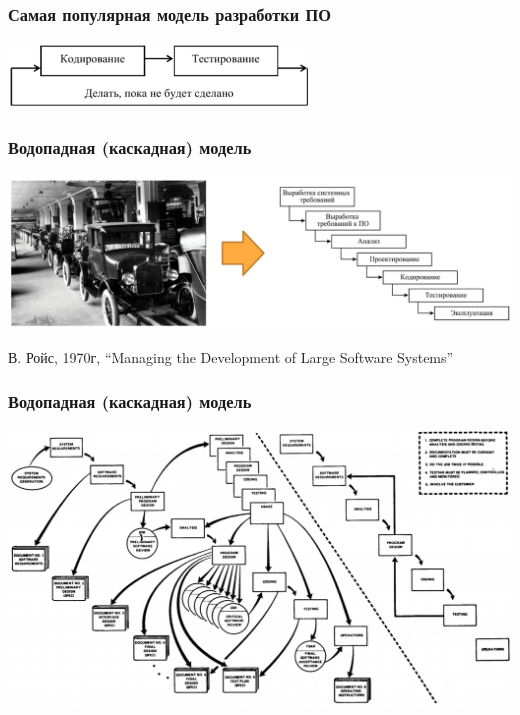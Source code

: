 \documentclass{../../slides-style}
\begin{document}
    \begin{frame}
        \frametitle{Самая популярная модель разработки ПО}
        \begin{center}
            \includegraphics[width=0.6\textwidth]{cowboyCodingModel.png}
        \end{center}
    \end{frame}

    \begin{frame}
        \frametitle{Водопадная (каскадная) модель}
        \begin{center}
            \includegraphics[width=\textwidth]{waterfallAndConveyor.png}
        \end{center}
        В. Ройс, 1970г, ``Managing the Development of Large Software Systems''
    \end{frame}

    \begin{frame}
        \frametitle{Водопадная (каскадная) модель}
        \begin{center}
            \includegraphics[width=\textwidth]{waterfallDetailed.png}
        \end{center}
    \end{frame}
\end{document}
